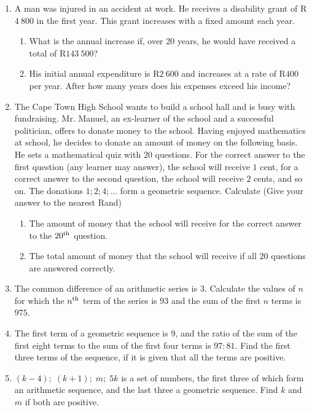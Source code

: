 \begin{enumerate}
\item A man was injured in an accident at work. He receives a disability grant of R$4~800$ in the first year. This grant increases with a fixed amount each year.
\begin{enumerate}
\item What is the annual increase if, over 20 years, he would have received a total of R$143~500$?
\item His initial annual expenditure is R$2~600$ and increases at a rate of R$400$ per year. After how many years does his expenses exceed his income?
\end{enumerate}
\item{The Cape Town High School wants to build a school hall and is busy with fundraising. Mr. Manuel, an ex-learner of the school and a successful politician, offers to donate money to the school. Having enjoyed mathematics at school, he decides to donate an amount of money on the following basis.
He sets a mathematical quiz with $20$ questions. For the correct answer to the first question (any learner may answer), the school will receive $1$ cent, for a correct answer to the second question, the school will receive $2$ cents, and so on. The donations $1; 2; 4; \ldots$ form a geometric sequence. Calculate (Give your answer to the nearest Rand)
\begin{enumerate}
\item{The amount of money that the school will receive for the correct answer to the $20^{\rm{th}}$ question.}
\item{The total amount of money that the school will receive if all $20$ questions are answered correctly.}
\end{enumerate}
}\item{ The common difference of an arithmetic series is $3$. Calculate the values of $n$ for which the $n^{\rm{th}}$ term of the series is $93$ and the sum of the first $n$ terms is $975$.}

\item{The first term of a geometric sequence is $9$, and the ratio of the sum of the first eight terms to the sum of the first four terms is $97:81$. Find the first three terms of the sequence, if it is given that all the terms are positive.}

\item{$(k-4); \; (k+1); \; m; \; 5k$ is a set of numbers, the first three of which form an arithmetic sequence, and the last three a geometric sequence. Find $k$ and $m$ if both are positive.}


\end{enumerate}
